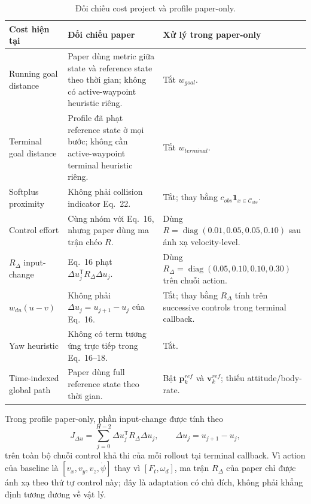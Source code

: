 \documentclass[11pt,a4paper]{article}
\newcommand{\vect}[1]{\bm{#1}}
\begin{document}
\begin{table}[ht]
\centering\small
\caption{Đối chiếu cost project và profile paper-only.}
\label{tab:cost-audit}
\begin{tabularx}{\textwidth}{L{0.23\textwidth}L{0.31\textwidth}Y}
\toprule
\textbf{Cost hiện tại} & \textbf{Đối chiếu paper} & \textbf{Xử lý trong paper-only} \\
\midrule
Running goal distance & Paper dùng metric giữa state và reference state theo thời gian; không có active-waypoint heuristic riêng. & Tắt $w_{goal}$. \\
Terminal goal distance & Profile đã phạt reference state ở mọi bước; không cần active-waypoint terminal heuristic riêng. & Tắt $w_{terminal}$. \\
Softplus proximity & Không phải collision indicator Eq.~22. & Tắt; thay bằng $c_{obs}\mathbf{1}_{x\in\mathcal C_{obs}}$. \\
Control effort & Cùng nhóm với Eq.~16, nhưng paper dùng ma trận chéo $R$. & Dùng $R=\operatorname{diag}(0.01,0.05,0.05,0.10)$ sau ánh xạ velocity-level. \\
$R_{\Delta}$ input-change & Eq.~16 phạt $\Delta u_j^\mathsf{T}R_{\Delta}\Delta u_j$. & Dùng $R_{\Delta}=\operatorname{diag}(0.05,0.10,0.10,0.30)$ trên chuỗi action. \\
$w_{du}(u-v)$ & Không phải $\Delta u_j=u_{j+1}-u_j$ của Eq.~16. & Tắt; thay bằng $R_{\Delta}$ tính trên successive controls trong terminal callback. \\
Yaw heuristic & Không có term tương ứng trực tiếp trong Eq.~16--18. & Tắt. \\
Time-indexed global path & Paper dùng full reference state theo thời gian. & Bật $\vect p_k^{ref}$ và $\vect v_k^{ref}$; thiếu attitude/body-rate. \\
\bottomrule
\end{tabularx}
\end{table}

Trong profile paper-only, phần input-change được tính theo
\begin{equation}
J_{\Delta u}=\sum_{j=0}^{H-2}
\Delta u_j^\mathsf{T}R_{\Delta}\Delta u_j,
\qquad \Delta u_j=u_{j+1}-u_j,
\end{equation}
trên toàn bộ chuỗi control khả thi của mỗi rollout tại terminal callback. Vì action của
baseline là $[v_x,v_y,v_z,\dot\psi]$ thay vì $[F_t,\omega_d]$, ma trận
$R_{\Delta}$ của paper chỉ được ánh xạ theo thứ tự control này; đây là
adaptation có chủ đích, không phải khẳng định tương đương về vật lý.
\end{document}
